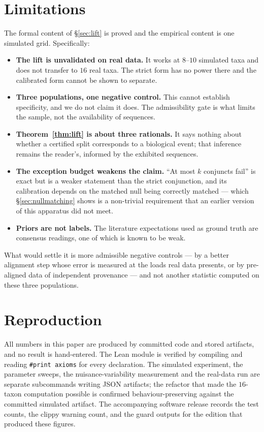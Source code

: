 \documentclass[11pt,a4paper]{article}
\theoremstyle{definition}
\theoremstyle{remark}
\begin{document}
\section{Limitations}\label{sec:limits}

The formal content of \S\ref{sec:lift} is proved and the empirical content is
one simulated grid. Specifically:

\begin{itemize}
\item \textbf{The lift is unvalidated on real data.} It works at $8$--$10$
simulated taxa and does not transfer to $16$ real taxa. The strict form has no
power there and the calibrated form cannot be shown to separate.
\item \textbf{Three populations, one negative control.} This cannot establish
specificity, and we do not claim it does. The admissibility gate is what limits
the sample, not the availability of sequences.
\item \textbf{Theorem~\ref{thm:lift} is about three rationals.} It says nothing
about whether a certified split corresponds to a biological event; that inference
remains the reader's, informed by the exhibited sequences.
\item \textbf{The exception budget weakens the claim.} ``At most $k$ conjuncts
fail'' is exact but is a weaker statement than the strict conjunction, and its
calibration depends on the matched null being correctly matched --- which
\S\ref{sec:nullmatching} shows is a non-trivial requirement that an earlier
version of this apparatus did not meet.
\item \textbf{Priors are not labels.} The literature expectations used as ground
truth are consensus readings, one of which is known to be weak.
\end{itemize}

What would settle it is more admissible negative controls --- by a better
alignment step whose error is measured at the loads real data presents, or by
pre-aligned data of independent provenance --- and not another statistic computed
on these three populations.

\section{Reproduction}\label{sec:repro}

All numbers in this paper are produced by committed code and stored artifacts,
and no result is hand-entered. The Lean module is verified by compiling and
reading \texttt{\#print axioms} for every declaration. The simulated experiment,
the parameter sweeps, the nuisance-variability measurement and the real-data run
are separate subcommands writing JSON artifacts; the refactor that made the
$16$-taxon computation possible is confirmed behaviour-preserving against the
committed simulated artifact. The accompanying software release records the test
counts, the clippy warning count, and the guard outputs for the edition that
produced these figures.
\end{document}
